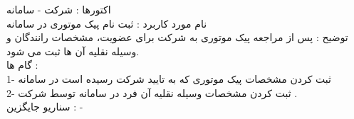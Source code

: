 \documentclass[14pt]{article}
\begin{document}
اکتورها :  شرکت - سامانه \\
نام مورد کاربرد : ثبت نام پیک موتوری در سامانه  \\
توضیح : پس از مراجعه پیک موتوری به شرکت برای عضویت، مشخصات رانندگان و وسیله نقلیه آن ها ثبت می شود. \\
گام ها : \\
1- ثبت کردن مشخصات پیک موتوری که به تایید شرکت رسیده است در سامانه \\
2-  ثبت کردن مشخصات وسیله نقلیه آن فرد در سامانه توسط شرکت .  \\
سناریو جایگزین : - \\
\end{document}
